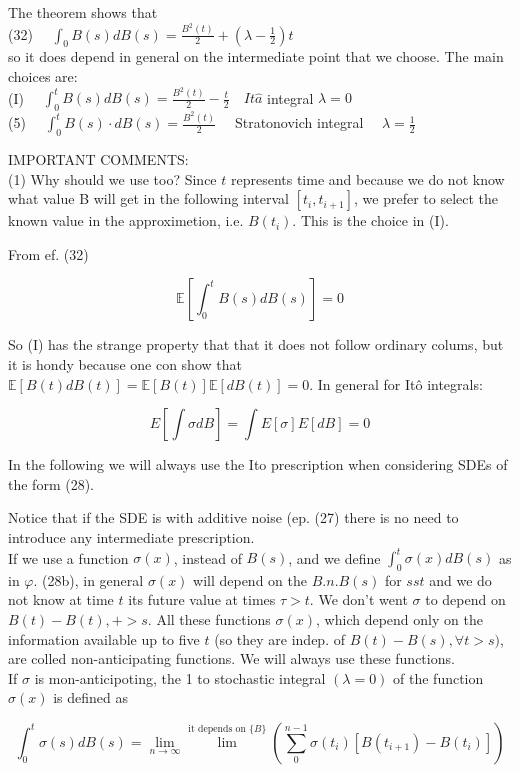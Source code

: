\documentclass[10pt]{article}
\begin{document}
The theorem shows that\\
(32) $\quad \int_{0} B(s) d B(s)=\frac{B^{2}(t)}{2}+\left(\lambda-\frac{1}{2}\right) t$\\
so it does depend in general on the intermediate point that we choose. The main choices are:\\
(I) $\quad \int_{0}^{t} B(s) d B(s)=\frac{B^{2}(t)}{2}-\frac{t}{2} \quad I t \hat{a}$ integral $\lambda=0$\\
(5) $\quad \int_{0}^{t} B(s) \cdot d B(s)=\frac{B^{2}(t)}{2} \quad$ Stratonovich integral $\quad \lambda=\frac{1}{2}$

IMPORTANT COMMENTS:\\
(1) Why should we use too? Since $t$ represents time and because we do not know what value B will get in the following interval $\left[t_{i}, t_{i+1}\right]$, we prefer to select the known value in the approximetion, i.e. $B\left(t_{i}\right)$. This is the choice in (I).

From ef. (32)

$$
\mathbb{E}\left[\int_{0}^{t} B(s) d B(s)\right]=0
$$

So (I) has the strange property that that it does not follow ordinary colums, but it is hondy because one con show that $\mathbb{E}[B(t) d B(t)]=\mathbb{E}[B(t)] \mathbb{E}[d B(t)]=0$. In general for Itô integrals:

$$
E\left[\int \sigma d B\right]=\int E[\sigma] E[d B]=0
$$

In the following we will always use the Ito prescription when considering SDEs of the form (28).

Notice that if the SDE is with additive noise (ep. (27) there is no need to introduce any intermediate prescription.\\
If we use a function $\sigma(x)$, instead of $B(s)$, and we define $\int_{0}^{t} \sigma(x) d B(s)$ as in $\varphi$. (28b), in general $\sigma(x)$ will depend on the $B . n . B(s)$ for $s s t$ and we do not know at time $t$ its future value at times $\tau>t$. We don't went $\sigma$ to depend on $B(t)-B(t),+>s$. All these functions $\sigma(x)$, which depend only on the information available up to five $t$ (so they are indep. of $B(t)-B(s), \forall t>s)$, are colled non-anticipating functions. We will always use these functions.\\
If $\sigma$ is mon-anticipoting, the 1 to stochastic integral $(\lambda=0)$ of the function $\sigma(x)$ is defined as

$$
\int_{0}^{t} \sigma(s) d B(s)=\lim _{n \rightarrow \infty} \lim ^{\text {it depends on }\{B\}}\left(\sum_{0}^{n-1} \sigma\left(t_{i}\right)\left[B\left(t_{i+1}\right)-B\left(t_{i}\right)\right]\right)
$$
\end{document}
